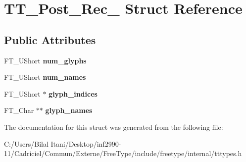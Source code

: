 \hypertarget{struct_t_t___post__20_rec__}{}\section{T\+T\+\_\+\+Post\+\_\+Rec\+\_\+ Struct Reference}
\label{struct_t_t___post__20_rec__}
\subsection*{Public Attributes}
\begin{DoxyCompactItemize}
\item 
F\+T\+\_\+\+U\+Short {\bfseries num\+\_\+glyphs}\hypertarget{struct_t_t___post__20_rec___ae3de3677810e6581f2c197e8fa902979}{}\label{struct_t_t___post__20_rec___ae3de3677810e6581f2c197e8fa902979}

\item 
F\+T\+\_\+\+U\+Short {\bfseries num\+\_\+names}\hypertarget{struct_t_t___post__20_rec___af726ff4997521c76de36f76e1203e2b1}{}\label{struct_t_t___post__20_rec___af726ff4997521c76de36f76e1203e2b1}

\item 
F\+T\+\_\+\+U\+Short $\ast$ {\bfseries glyph\+\_\+indices}\hypertarget{struct_t_t___post__20_rec___a7f0a07ab96ccbe2597378f7aa2de3f8c}{}\label{struct_t_t___post__20_rec___a7f0a07ab96ccbe2597378f7aa2de3f8c}

\item 
F\+T\+\_\+\+Char $\ast$$\ast$ {\bfseries glyph\+\_\+names}\hypertarget{struct_t_t___post__20_rec___a8330fbc7db3659ac621e98d7ceb8aad3}{}\label{struct_t_t___post__20_rec___a8330fbc7db3659ac621e98d7ceb8aad3}

\end{DoxyCompactItemize}


The documentation for this struct was generated from the following file\+:\begin{DoxyCompactItemize}
\item 
C\+:/\+Users/\+Bilal Itani/\+Desktop/inf2990-\/11/\+Cadriciel/\+Commun/\+Externe/\+Free\+Type/include/freetype/internal/tttypes.\+h\end{DoxyCompactItemize}
